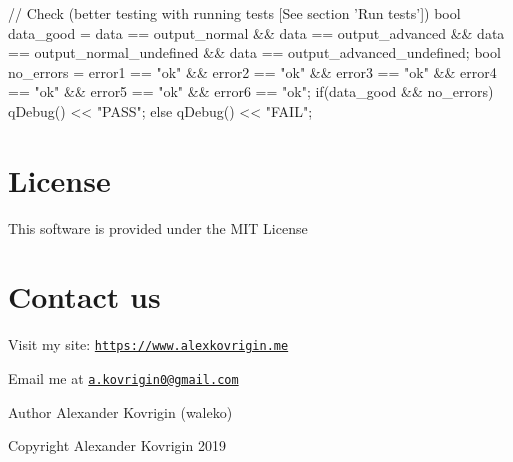 \begin{DoxyCode}
\textcolor{comment}{// Check (better testing with running tests [See section 'Run tests'])}
\textcolor{keywordtype}{bool} data\_good =
    data == output\_normal &&
    data == output\_advanced &&
    data == output\_normal\_undefined &&
    data == output\_advanced\_undefined;
\textcolor{keywordtype}{bool} no\_errors =
    error1 == \textcolor{stringliteral}{"ok"} &&
    error2 == \textcolor{stringliteral}{"ok"} &&
    error3 == \textcolor{stringliteral}{"ok"} &&
    error4 == \textcolor{stringliteral}{"ok"} &&
    error5 == \textcolor{stringliteral}{"ok"} &&
    error6 == \textcolor{stringliteral}{"ok"};
\textcolor{keywordflow}{if}(data\_good && no\_errors)
    qDebug() << \textcolor{stringliteral}{"PASS"};
\textcolor{keywordflow}{else}
    qDebug() << \textcolor{stringliteral}{"FAIL"};
\end{DoxyCode}
\hypertarget{index_license}{}\section{License}\label{index_license}
This software is provided under the M\+IT License\hypertarget{index_contact}{}\section{Contact us}\label{index_contact}
Visit my site\+: \href{https://www.alexkovrigin.me}{\tt https\+://www.\+alexkovrigin.\+me}

Email me at \href{mailto:a.kovrigin0@gmail.com}{\tt a.\+kovrigin0@gmail.\+com}

\begin{DoxyAuthor}{Author}
Alexander Kovrigin (waleko) 
\end{DoxyAuthor}
\begin{DoxyCopyright}{Copyright}
Alexander Kovrigin 2019  
\end{DoxyCopyright}
